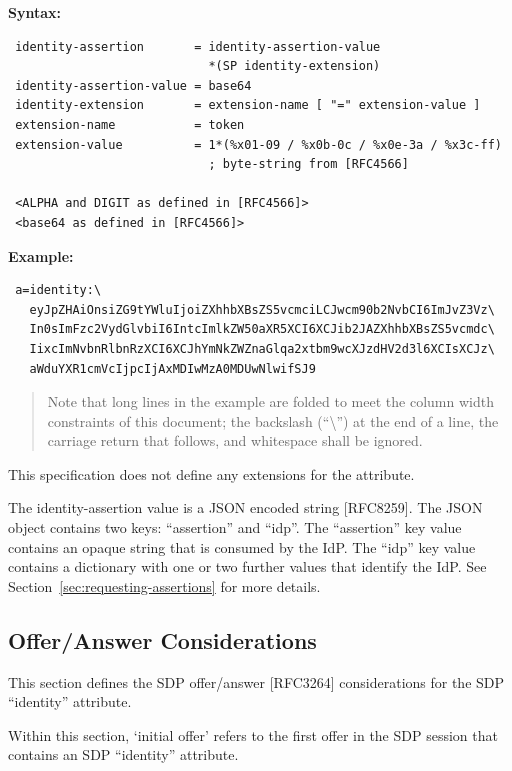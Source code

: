 \documentclass{article}
\begin{document}
\noindent\textbf{Syntax:}

\begin{verbatim}
 identity-assertion       = identity-assertion-value
                            *(SP identity-extension)
 identity-assertion-value = base64
 identity-extension       = extension-name [ "=" extension-value ]
 extension-name           = token
 extension-value          = 1*(%x01-09 / %x0b-0c / %x0e-3a / %x3c-ff)
                            ; byte-string from [RFC4566]

 <ALPHA and DIGIT as defined in [RFC4566]>
 <base64 as defined in [RFC4566]>
\end{verbatim}

\noindent\textbf{Example:}

\begin{verbatim}
 a=identity:\
   eyJpZHAiOnsiZG9tYWluIjoiZXhhbXBsZS5vcmciLCJwcm90b2NvbCI6ImJvZ3Vz\
   In0sImFzc2VydGlvbiI6IntcImlkZW50aXR5XCI6XCJib2JAZXhhbXBsZS5vcmdc\
   IixcImNvbnRlbnRzXCI6XCJhYmNkZWZnaGlqa2xtbm9wcXJzdHV2d3l6XCIsXCJz\
   aWduYXR1cmVcIjpcIjAxMDIwMzA0MDUwNlwifSJ9
\end{verbatim}

\begin{quote}
Note that long lines in the example are folded to meet the
column width constraints of this document; the backslash (``\textbackslash'')
at the end of a line, the carriage return that follows, and
whitespace shall be ignored.
\end{quote}

This specification does not define any extensions for the attribute.

The identity-assertion value is a JSON encoded string [RFC8259].  The
JSON object contains two keys: ``assertion'' and ``idp''.  The
``assertion'' key value contains an opaque string that is consumed by
the IdP.  The ``idp'' key value contains a dictionary with one or two
further values that identify the IdP.  See Section~\ref{sec:requesting-assertions} for more
details.

\subsection{Offer/Answer Considerations}

This section defines the SDP offer/answer [RFC3264] considerations
for the SDP ``identity'' attribute.

Within this section, `initial offer' refers to the first offer in the
SDP session that contains an SDP ``identity'' attribute.
\end{document}
